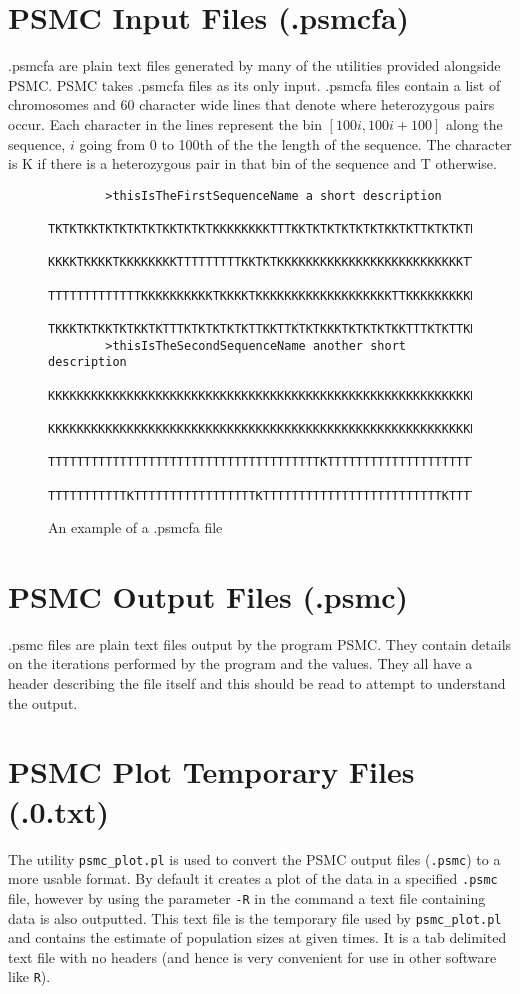 \documentclass[a4]{article}
\begin{document}
\section{PSMC Input Files (.psmcfa)}
	.psmcfa are plain text files generated by many of the utilities provided alongside PSMC. PSMC takes .psmcfa files as its only input. .psmcfa files contain a list of chromosomes and 60 character wide lines that denote where heterozygous pairs occur. Each character in the lines represent the bin  $[100i,100i+100]$ along the sequence, $i$ going from 0 to 100th of the the length of the sequence. The character is K if there is a heterozygous pair in that bin of the sequence and T otherwise.
	\begin{figure}[h]
		\begin{lstlisting}
		>thisIsTheFirstSequenceName a short description
		TKTKTKKTKTKTKTKTKKTKTKTKKKKKKKKTTTKKTKTKTKTKTKTKKTKTTKTKTKTK
		KKKKTKKKKTKKKKKKKKTTTTTTTTTKKTKTKKKKKKKKKKKKKKKKKKKKKKKKKKTT
		TTTTTTTTTTTTTKKKKKKKKKKTKKKKTKKKKKKKKKKKKKKKKKKKTTKKKKKKKKKK
		TKKKTKTKKTKTKKTKTTTKTKTKTKTKTTKKTTKTKTKKKTKTKTKTKKTTTKTKTTKK
		>thisIsTheSecondSequenceName another short description
		KKKKKKKKKKKKKKKKKKKKKKKKKKKKKKKKKKKKKKKKKKKKKKKKKKKKKKKKKKKK
		KKKKKKKKKKKKKKKKKKKKKKKKKKKKKKKKKKKKKKKKKKKKKKKKKKKKKKKKKKKK
		TTTTTTTTTTTTTTTTTTTTTTTTTTTTTTTTTTTTTTKTTTTTTTTTTTTTTTTTTTTT
		TTTTTTTTTTTKTTTTTTTTTTTTTTTTTKTTTTTTTTTTTTTTTTTTTTTTTTTKTTTT
		\end{lstlisting}
		\caption{An example of a .psmcfa file}
	\end{figure}
	
\section{PSMC Output Files (.psmc)}
	.psmc files are plain text files output by the program PSMC. They contain details on the iterations performed by the program and the values. They all have a header describing the file itself and this should be read to attempt to understand the output.

\section{PSMC Plot Temporary Files (.0.txt)}
	The utility \verb|psmc_plot.pl| is used to convert the PSMC output files (\verb|.psmc|) to a more usable format. By default it creates a plot of the data in a specified \verb|.psmc| file, however by using the parameter \verb|-R| in the command a text file containing data is also outputted. This text file is the temporary file used by \verb|psmc_plot.pl| and contains the estimate of population sizes at given times. It is a tab delimited text file with no headers (and hence is very convenient for use in other software like \verb|R|). 
\end{document}
